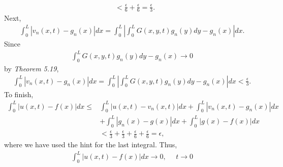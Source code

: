 \begin{questions}
\begin{solution}
\begin{align*}
&<\frac{\epsilon}{6}+\frac{\epsilon}{6}=\frac{\epsilon}{3}.
\end{align*}
Next,
\begin{align*}
\int_0^L|v_n(x,t)-g_n(x)|dx=\int_0^L\left|\int_0^LG(x,y,t)g_n(y)dy-g_n(x)\right|dx.
\end{align*}
Since
\begin{align*}
\int_0^LG(x,y,t)g_n(y)dy-g_n(x)\rightarrow 0
\end{align*}
by \textsl{Theorem 5.19},
\begin{align*}
\int_0^L|v_n(x,t)-g_n(x)|dx=\int_0^L\left|\int_0^LG(x,y,t)g_n(y)dy-g_n(x)\right|dx<\frac{\epsilon}{3}.
\end{align*}
To finish,
\begin{align*}
\int_0^L|u(x,t)-f(x)|dx\leq& \int_0^L|u(x,t)-v_n(x,t)|dx+\int_0^L|v_n(x,t)-g_n(x)|dx\\
&+\int_0^L|g_n(x)-g(x)|dx+\int_0^L|g(x)-f(x)|dx\\
&<\frac{\epsilon}{3}+\frac{\epsilon}{3}+\frac{\epsilon}{6}+\frac{\epsilon}{6}=\epsilon,
\end{align*}
where we have used the hint for the last integral. Thus,
\begin{align*}
\int_0^L|u(x,t)-f(x)|dx\rightarrow 0,~~~~~~t\rightarrow 0
\end{align*}
\end{solution}
\end{questions}
